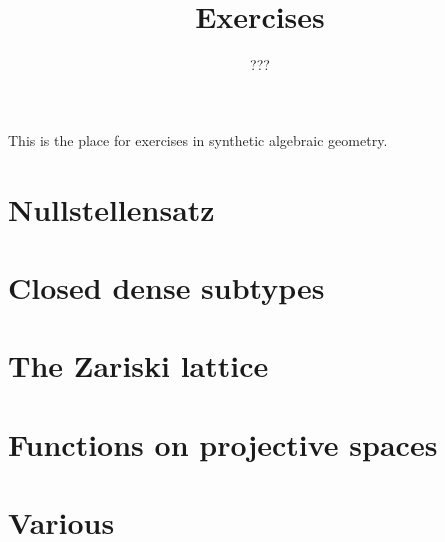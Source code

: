 \documentclass{../util/zariski-small}
\title{Exercises}
\theoremstyle{break}
\begin{document}
\author{???}

\maketitle

This is the place for exercises in synthetic algebraic geometry.

\section{Nullstellensatz}


\section{Closed dense subtypes}


\section{The Zariski lattice}


\section{Functions on projective spaces}


\section{Various}


\printbibliography
\end{document}
